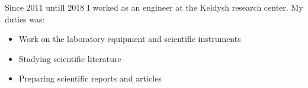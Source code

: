 \documentclass[10pt]{developercv} %
\begin{document}

\begin{minipage}[t]{1\textwidth}
	\vspace{-\baselineskip} %



	Since 2011 untill 2018 I worked as an engineer at the Keldysh
	research center.
	My duties was:
	\begin{itemize}
		\setlength\itemsep{0pt}
		\setlength\itemindent{-\baselineskip}
		\item{Work on the laboratory equipment and scientific instruments}
		\item{Stadying scientific literature}
		\item{Preparing scientific reports and articles}
	\end{itemize}


\end{minipage}
\hfill

\end{document}
